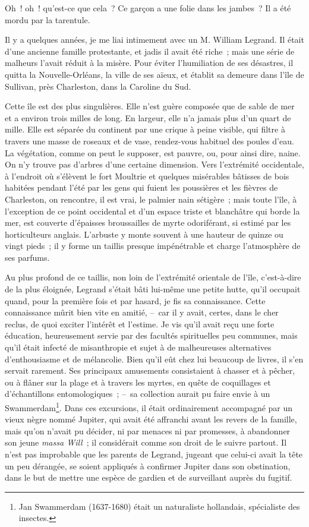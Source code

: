 \documentclass[french,twoside]{book} %
\newcommand{\bibl}[1]{{\RaggedLeft{#1}\par\bigskip}}
\begin{document}
\noindent Oh ! oh ! qu’est-ce que cela ? Ce garçon a une folie dans les jambes ? Il a été mordu par la tarentule.\par

\bibl{(Tout de travers.)}
\noindent Il y a quelques années, je me liai intimement avec un M. William Legrand. Il était d’une ancienne famille protestante, et jadis il avait été riche ; mais une série de malheurs l’avait réduit à la misère. Pour éviter l’humiliation de ses désastres, il quitta la Nouvelle-Orléans, la ville de ses aïeux, et établit sa demeure dans l’île de Sullivan, près Charleston, dans la Caroline du Sud.\par
Cette île est des plus singulières. Elle n’est guère composée que de sable de mer et a environ trois milles de long. En largeur, elle n’a jamais plus d’un quart de mille. Elle est séparée du continent par une crique à peine visible, qui filtre à travers une masse de roseaux et de vase, rendez-vous habituel des poules d’eau. La végétation, comme on peut le supposer, est pauvre, ou, pour ainsi dire, naine. On n’y trouve pas d’arbres d’une certaine dimension. Vers l’extrémité occidentale, à l’endroit où s’élèvent le fort Moultrie et quelques misérables bâtisses de bois habitées pendant l’été par les gens qui fuient les poussières et les fièvres de Charleston, on rencontre, il est vrai, le palmier nain sétigère ; mais toute l’île, à l’exception de ce point occidental et d’un espace triste et blanchâtre qui borde la mer, est couverte d’épaisses broussailles de myrte odoriférant, si estimé par les horticulteurs anglais. L’arbuste y monte souvent à une hauteur de quinze ou vingt pieds ; il y forme un taillis presque impénétrable et charge l’atmosphère de ses parfums.\par
Au plus profond de ce taillis, non loin de l’extrémité orientale de l’île, c’est-à-dire de la plus éloignée, Legrand s’était bâti lui-même une petite hutte, qu’il occupait quand, pour la première fois et par hasard, je fis sa connaissance. Cette connaissance mûrit bien vite en amitié, – car il y avait, certes, dans le cher reclus, de quoi exciter l’intérêt et l’estime. Je vis qu’il avait reçu une forte éducation, heureusement servie par des facultés spirituelles peu communes, mais qu’il était infecté de misanthropie et sujet à de malheureuses alternatives d’enthousiasme et de mélancolie. Bien qu’il eût chez lui beaucoup de livres, il s’en servait rarement. Ses principaux amusements consistaient à chasser et à pêcher, ou à flâner sur la plage et à travers les myrtes, en quête de coquillages et d’échantillons entomologiques ; – sa collection aurait pu faire envie à un Swammerdam\footnote{Jan Swammerdam (1637-1680) était un naturaliste hollandais, spécialiste des insectes.}. Dans ces excursions, il était ordinairement accompagné par un vieux nègre nommé Jupiter, qui avait été affranchi avant les revers de la famille, mais qu’on n’avait pu décider, ni par menaces ni par promesses, à abandonner son jeune \emph{massa Will} ; il considérait comme son droit de le suivre partout. Il n’est pas improbable que les parents de Legrand, jugeant que celui-ci avait la tête un peu dérangée, se soient appliqués à confirmer Jupiter dans son obstination, dans le but de mettre une espèce de gardien et de surveillant auprès du fugitif.\par
\end{document}
